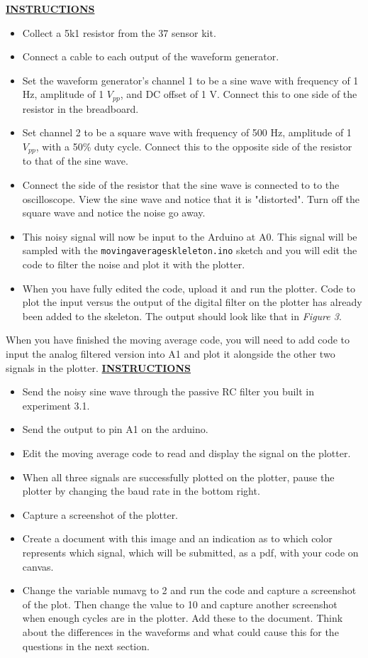 \documentclass[12pt]{article}
\begin{document}
\textbf{\underline{INSTRUCTIONS}}
\begin{itemize}
    \item Collect a 5k1 resistor from the 37 sensor kit.
    \item Connect a cable to each output of the waveform generator. 
    \item Set the waveform generator's channel 1 to be a sine wave with frequency of 1 Hz, amplitude of 1 $V_{pp}$, and DC offset of 1 V. Connect this to one side of the resistor in the breadboard.
    \item Set channel 2 to be a square wave with frequency of 500 Hz, amplitude of 1 $V_{pp}$, with a 50\% duty cycle. Connect this to the opposite side of the resistor to that of the sine wave.
    \item Connect the side of the resistor that the sine wave is connected to to the oscilloscope. View the sine wave and notice that it is "distorted". Turn off the square wave and notice the noise go away.
    \item This noisy signal will now be input to the Arduino at A0. This signal will be sampled with the \texttt{movingaverageskleleton.ino} sketch and you will edit the code to filter the noise and plot it with the plotter.
    \item When you have fully edited the code, upload it and run the plotter. Code to plot the input versus the output of the digital filter on the plotter has already been added to the skeleton. The output should look like that in \textit{Figure 3}.
    \end{itemize}
 When you have finished the moving average code, you will need to add code to input the analog filtered version into A1 and plot it alongside the other two signals in the plotter.
 \newpage
 \textbf{\underline{INSTRUCTIONS}}
 \begin{itemize}
    \item Send the noisy sine wave through the passive RC filter you built in experiment 3.1. 
    \item Send the output to pin A1 on the arduino. 
    \item Edit the moving average code to read and display the signal on the plotter. 
    \item When all three signals are successfully plotted on the plotter, pause the plotter by changing the baud rate in the bottom right.
    \item Capture a screenshot of the plotter. 
    \item Create a document with this image and an indication as to which color represents which signal, which will be submitted, as a pdf, with your code on canvas.
    \item Change the variable numavg to 2 and run the code and capture a screenshot of the plot. Then change the value to 10 and capture another screenshot when enough cycles are in the plotter. Add these to the document. Think about the differences in the waveforms and what could cause this for the questions in the next section.
\end{itemize}
\end{document}
